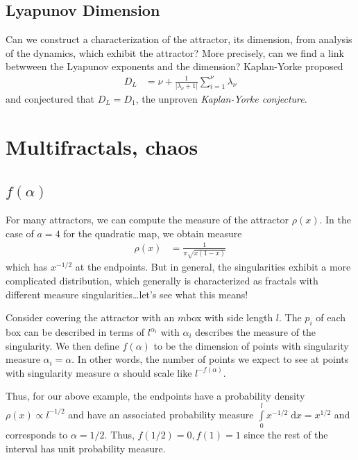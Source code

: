 \documentclass[12pt]{article}
\newcommand{\abs}[1]{\left|#1\right|}
\begin{document}
\subsection{Lyapunov Dimension}

Can we construct a characterization of the attractor, its dimension, from
analysis of the dynamics, which exhibit the attractor? More precisely, can we
find a link betwween the Lyapunov exponents and the dimension? Kaplan-Yorke
proposed
\begin{align}
    D_L &= \nu + \frac{1}{\abs{\lambda_\nu + 1}}
    \sum\limits_{i=1}^{\nu}\lambda_\nu
\end{align}
and conjectured that $D_L = D_1$, the unproven \emph{Kaplan-Yorke conjecture}.

\clearpage

\section{Multifractals, chaos}

\subsection{$f(\alpha)$}

For many attractors, we can compute the measure of the attractor $\rho(x)$. In
the case of $a=4$ for the quadratic map, we obtain measure
\begin{align}
    \rho(x) &= \frac{1}{\pi\sqrt{x(1-x)}}
\end{align}
which has $x^{-1/2}$ at the endpoints. But in general, the singularities exhibit
a more complicated distribution, which generally is characterized as fractals
with different measure singularities\dots let's see what this means!

Consider covering the attractor with an $m$box with side length $l$. The
$p_i$ of each box can be described in terms of $l^{\alpha_i}$ with $\alpha_i$
describes the measure of the singularity. We then define $f(\alpha)$ to be the
dimension of points with singularity measure $\alpha_i = \alpha$. In other
words, the number of points we expect to see at points with singularity measure
$\alpha$ should scale like $l^{-f(\alpha)}$.

Thus, for our above example, the endpoints have a probability density $\rho(x)
\propto l^{-1/2}$ and have an associated probability measure
$\int\limits_{0}^{l}x^{ -1/2}\;\mathrm{d}x=x^{1/2}$ and corresponds to $\alpha =
1/2$. Thus, $f(1/2) = 0, f(1) = 1$ since the rest of the interval has unit
probability measure.
\end{document}
